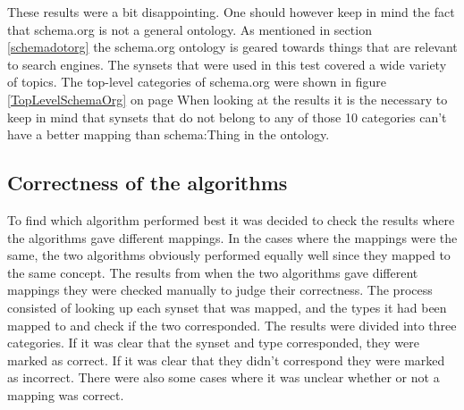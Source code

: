 These results were a bit disappointing.
One should however keep in mind the fact that schema.org is not a general ontology.
As mentioned in section \ref{schemadotorg} the schema.org ontology is geared towards things that are relevant to search engines.
The synsets that were used in this test covered a wide variety of topics.
The top-level categories of schema.org were shown in figure \ref {TopLevelSchemaOrg} on page \pageref{TopLevelSchemaOrg}
When looking at the results it is the necessary to keep in mind that
synsets that do not belong to any of those 10 categories can't have a better mapping than schema:Thing in the ontology.

\subsection{Correctness of the algorithms}
To find which algorithm performed best it was decided to check the results where the algorithms gave different mappings.
In the cases where the mappings were the same, the two algorithms obviously performed equally well since they mapped to
the same concept.
The results from when the two algorithms gave different mappings they were checked manually to judge their correctness.
The process consisted of looking up each synset that was mapped,
and the types it had been mapped to and check if the two corresponded.
The results were divided into three categories.
If it was clear that the synset and type corresponded, they were marked as correct.
If it was clear that they didn't correspond they were marked as incorrect.
There were also some cases where it was unclear whether or not a mapping was correct.

